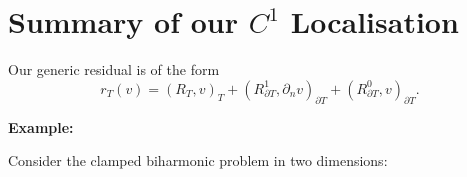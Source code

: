 \documentclass[12pt,a4paper]{article}
\newcommand{\dn}{\partial_n}
\newcommand{\Rone}{R_{\partial T}^{1}}
\newcommand{\Rzero}{R_{\partial T}^{0}}
\begin{document}


\newpage 
\section{Summary of our $C^1$ Localisation}


Our generic residual is of the form
\begin{equation}
    r_T(v)
    =(R_T,v)_T
      +(\Rone,\dn v)_{\partial T}
      +(\Rzero,v)_{\partial T}.
\end{equation}

\textbf{Example:}

Consider the clamped biharmonic problem in two dimensions:
\end{document}
